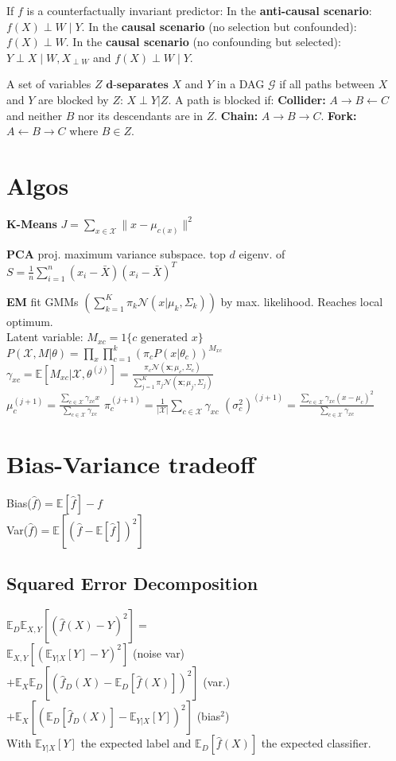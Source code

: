 If $f$ is a counterfactually invariant predictor:
In the \textbf{anti-causal scenario}: $f(X) {\perp} W {\mid} Y$.
In the \textbf{causal scenario} (no selection but confounded): $f(X) {\perp} W$.
In the \textbf{causal scenario} (no confounding but selected): $Y \perp X \mid W, X_{\perp W}$ and $f(X) \perp W \mid Y$.

A set of variables $Z$ $\textbf{d-separates}$ $X$ and $Y$ in a DAG $\mathcal{G}$ if all paths between $X$ and $Y$ are blocked by $Z$: $ X{\perp} Y | Z$. A path is blocked if:
\textbf{Collider:} $A {\to} B {\leftarrow} C$ and neither $B$ nor its descendants are in $Z$.
\textbf{Chain:} $A {\to} B {\to} C$. \textbf{Fork:} $A {\leftarrow} B {\to} C$ where $B \in Z$.

\section*{Algos}
\textbf{K-Means} 
$J {=} \sum_{x \in \mathcal{X}} \| x - \mu_{c(x)} \|^2$

\textbf{PCA} proj. maximum variance subspace.
top $d$ eigenv. of $S {=} \frac{1}{n} \sum_{i=1}^{n} (x_i {-} \bar{X})(x_i {-} \bar{X})^T$

\textbf{EM} fit GMMs $(\sum_{k=1}^{K} \pi_k \mathcal{N}(x | \mu_k, \Sigma_k))$ by max. likelihood. Reaches local optimum.\\
Latent variable: $M_{xc} = 1\{c \text{ generated } x\}$ \\
$P(\mathcal{X}, M | \theta) {=} \prod_{x} \prod_{c=1}^{k} (\pi_c P(x | \theta_c))^{M_{xc}}$
$\gamma_{xc} {=} \mathbb{E}[M_{xc} | \mathcal{X}, \theta^{(j)}] {=} \frac{\pi_c \mathcal{N}(\mathbf{x}; \mu_c, \Sigma_c)}{\sum_{j=1}^K \pi_j \mathcal{N}(\mathbf{x}; \mu_j, \Sigma_j)}$ \\
$\mu_c^{(j+1)} {=} \frac{\sum_{c \in \mathcal{X}} \gamma_{xc} x}{\sum_{c \in \mathcal{X}} \gamma_{xc}}$
$\pi_c^{(j+1)} {=} \frac{1}{|\mathcal{X}|} \sum_{c \in \mathcal{X}} \gamma_{xc}$ 
$(\sigma_c^2)^{(j+1)} {=} \frac{\sum_{c \in \mathcal{X}} \gamma_{xc} (x - \mu_c)^2}{\sum_{c \in \mathcal{X}} \gamma_{xc}}$ \\

\section*{Bias-Variance tradeoff}
Bias($\hat{f}$)$=\mathbb{E}[\hat{f}]-f$\\
Var($\hat{f}$)$=\mathbb{E}[(\hat{f}-\mathbb{E}[\hat{f}])^2]$
\subsection*{Squared Error Decomposition}
$\mathbb{E}_D\mathbb{E}_{X,Y}[(\hat{f}(X)-Y)^2]=$\\
$\mathbb{E}_{X,Y}[(\mathbb{E}_{Y|X}[Y]-Y)^2]$ (noise var)\\
$+\mathbb{E}_X\mathbb{E}_D[(\hat{f}_D(X)-\mathbb{E}_D[\hat{f}(X)])^2]$ (var.)\\
$+\mathbb{E}_X[(\mathbb{E}_D[\hat{f}_D(X)]-\mathbb{E}_{Y|X}[Y])^2]$ (bias$^2$)\\
With $\mathbb{E}_{Y|X}[Y]$ the expected label and $\mathbb{E}_{D}[\hat{f}(X)]$ the expected classifier.

